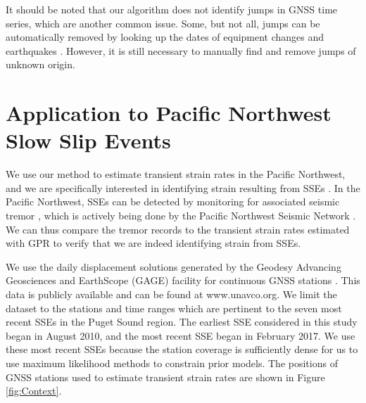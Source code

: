 \documentclass[extra,mreferee]{gji}
\begin{document}
It should be noted that our algorithm does not identify jumps in GNSS time series, which are another common issue. Some, but not all, jumps can be automatically removed by looking up the dates of equipment changes and earthquakes \citep{Gazeaux2013}. However, it is still necessary to manually find and remove jumps of unknown origin. 

\section{Application to Pacific Northwest Slow Slip Events}\label{sec:Cascadia}
We use our method to estimate transient strain rates in the Pacific Northwest, and we are specifically interested in identifying strain resulting from SSEs \citep[e.g.,][]{Dragert2001}. In the Pacific Northwest, SSEs can be detected by monitoring for associated seismic tremor \citep{Rogers2003}, which is actively being done by the Pacific Northwest Seismic Network \citep{Wech2010}. We can thus compare the tremor records to the transient strain rates estimated with GPR to verify that we are indeed identifying strain from SSEs.  

We use the daily displacement solutions generated by the Geodesy Advancing Geosciences and EarthScope (GAGE) facility for continuous GNSS stations \citep{Herring2016}. This data is publicly available and can be found at www.unavco.org. We limit the dataset to the stations and time ranges which are pertinent to the seven most recent SSEs in the Puget Sound region. The earliest SSE considered in this study began in August 2010, and the most recent SSE began in February 2017. We use these most recent SSEs because the station coverage is sufficiently dense for us to use maximum likelihood methods to constrain prior models.  The positions of GNSS stations used to estimate transient strain rates are shown in Figure \ref{fig:Context}.  
\end{document}
